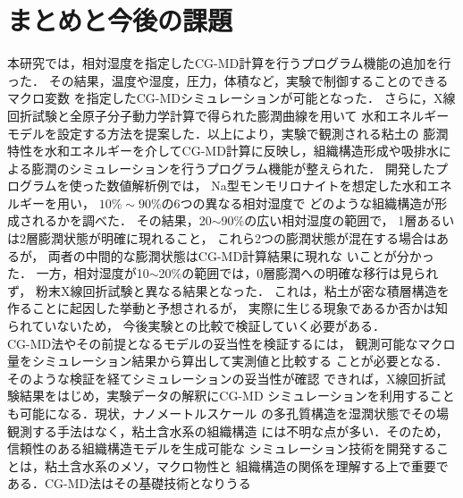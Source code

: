 ﻿\documentclass[11pt,a4j]{jarticle}
\begin{document}
\section{まとめと今後の課題}
本研究では，相対湿度を指定したCG-MD計算を行うプログラム機能の追加を行った．
その結果，温度や湿度，圧力，体積など，実験で制御することのできるマクロ変数
を指定したCG-MDシミュレーションが可能となった．
さらに，X線回折試験と全原子分子動力学計算で得られた膨潤曲線を用いて
水和エネルギーモデルを設定する方法を提案した．以上により，実験で観測される粘土の
膨潤特性を水和エネルギーを介してCG-MD計算に反映し，組織構造形成や吸排水に
よる膨潤のシミュレーションを行うプログラム機能が整えられた．
%
開発したプログラムを使った数値解析例では，
Na型モンモリロナイトを想定した水和エネルギーを用い，
$10\%\sim 90\%$の6つの異なる相対湿度で
どのような組織構造が形成されるかを調べた．
その結果，20$\sim$90$\%$の広い相対湿度の範囲で，
1層あるいは2層膨潤状態が明確に現れること，
これら2つの膨潤状態が混在する場合はあるが，
両者の中間的な膨潤状態はCG-MD計算結果に現れな
いことが分かった．
一方，相対湿度が10$\sim$20$\%$の範囲では，0層膨潤への明確な移行は見られず，
粉末X線回折試験と異なる結果となった．
これは，粘土が密な積層構造を作ることに起因した挙動と予想されるが，
実際に生じる現象であるか否かは知られていないため，
今後実験との比較で検証していく必要がある．
\\
%
\hspace{\parindent}
CG-MD法やその前提となるモデルの妥当性を検証するには，
観測可能なマクロ量をシミュレーション結果から算出して実測値と比較する
ことが必要となる．そのような検証を経てシミュレーションの妥当性が確認
できれば，X線回折試験結果をはじめ，実験データの解釈にCG-MD
シミュレーションを利用することも可能になる．現状，ナノメートルスケール
の多孔質構造を湿潤状態でその場観測する手法はなく，粘土含水系の組織構造
には不明な点が多い．そのため，信頼性のある組織構造モデルを生成可能な
シミュレーション技術を開発することは，粘土含水系のメソ，マクロ物性と
組織構造の関係を理解する上で重要である．CG-MD法はその基礎技術となりうる
\end{document}
